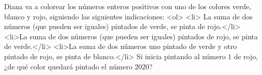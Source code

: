 
Diana va a colorear los números enteros positivos con uno de los colores verde, blanco y rojo, siguiendo las siguientes indicaciones:
<ol>
<li> La suma de dos números (que pueden ser iguales) pintados de verde, se pinta de rojo.</li>
<li>La suma de dos números (que pueden ser iguales) pintados de rojo, se pinta de verde.</li>
<li>La suma de dos números uno pintado de verde y otro pintado de rojo, se pinta de blanco.</li>
Si inicia pintando al número $1$ de rojo, ¿de qué color quedará pintado el número $2020$?
